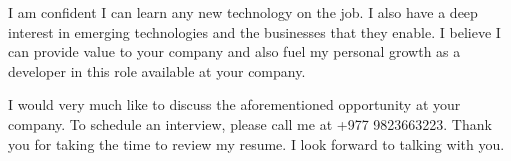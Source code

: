 \documentclass[11pt,a4paper,roman]{moderncv}
\begin{document}
\vspace{1em}
I am confident I can learn any new technology on the job. I also have a deep
interest in emerging technologies and the businesses that they enable.
I believe I can provide value to your company and also fuel my personal
growth as a developer in this role available at your company.

\vspace{1em}
I would very much like to discuss the aforementioned opportunity at your
company. To schedule an interview, please call me at +977 9823663223.
Thank you for taking the time to review my resume. I look forward to
talking with you.


\vspace{0.5cm}


\makeletterclosing
\end{document}
